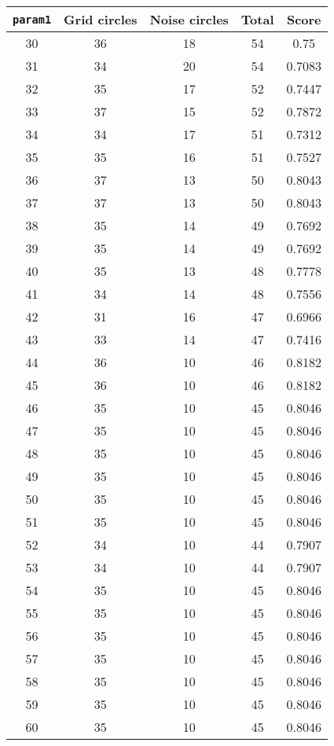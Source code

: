\documentclass[letterpaper, 12pt]{article}
\begin{document}
\begin{longtable}{|c|c|c|c|c|}
\hline
\textbf{\texttt{param1}} & \textbf{Grid circles} & \textbf{Noise circles} & \textbf{Total} & \textbf{Score} \\
\hline
30 & 36 & 18 & 54 & 0.75 \\
\hline
31 & 34 & 20 & 54 & 0.7083 \\
\hline
32 & 35 & 17 & 52 & 0.7447 \\
\hline
33 & 37 & 15 & 52 & 0.7872 \\
\hline
34 & 34 & 17 & 51 & 0.7312 \\
\hline
35 & 35 & 16 & 51 & 0.7527 \\
\hline
36 & 37 & 13 & 50 & 0.8043 \\
\hline
37 & 37 & 13 & 50 & 0.8043 \\
\hline
38 & 35 & 14 & 49 & 0.7692 \\
\hline
39 & 35 & 14 & 49 & 0.7692 \\
\hline
40 & 35 & 13 & 48 & 0.7778 \\
\hline
41 & 34 & 14 & 48 & 0.7556 \\
\hline
42 & 31 & 16 & 47 & 0.6966 \\
\hline
43 & 33 & 14 & 47 & 0.7416 \\
\hline
44 & 36 & 10 & 46 & 0.8182 \\
\hline
45 & 36 & 10 & 46 & 0.8182 \\
\hline
46 & 35 & 10 & 45 & 0.8046 \\
\hline
47 & 35 & 10 & 45 & 0.8046 \\
\hline
48 & 35 & 10 & 45 & 0.8046 \\
\hline
49 & 35 & 10 & 45 & 0.8046 \\
\hline
50 & 35 & 10 & 45 & 0.8046 \\
\hline
51 & 35 & 10 & 45 & 0.8046 \\
\hline
52 & 34 & 10 & 44 & 0.7907 \\
\hline
53 & 34 & 10 & 44 & 0.7907 \\
\hline
54 & 35 & 10 & 45 & 0.8046 \\
\hline
55 & 35 & 10 & 45 & 0.8046 \\
\hline
56 & 35 & 10 & 45 & 0.8046 \\
\hline
57 & 35 & 10 & 45 & 0.8046 \\
\hline
58 & 35 & 10 & 45 & 0.8046 \\
\hline
59 & 35 & 10 & 45 & 0.8046 \\
\hline
60 & 35 & 10 & 45 & 0.8046 \\

\end{longtable}
\end{document}
